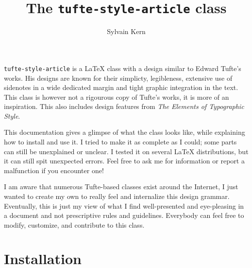 \documentclass[raggedright, 11pt]{tufte-style-article}
\title{The \texttt{tufte-style-article} class}
\author{Sylvain Kern}
\begin{document}
	
\maketitle	

\texttt{tufte-style-article} is a \LaTeX{} class with a design similar to Edward Tufte's works. His designs are known for their simplicty, legibleness, extensive use of sidenotes in a wide dedicated margin and tight graphic integration in the text. This class is however not a rigourous copy of Tufte's works, it is more of an inspiration. This also includes design features from \textit{The Elements of Typographic Style}.

This documentation gives a glimpse of what the class looks like, while explaining how to install and use it. I tried to make it as complete as I could; some parts can still be unexplained or unclear. I tested it on several \LaTeX{} distributions, but it can still spit unexpected errors. Feel free to ask me for information or report a malfunction if you encounter one!

I am aware that numerous Tufte-based classes exist around the Internet, I just wanted to create my own to really feel and internalize this design grammar. Eventually, this is just my view of what I find well-presented and eye-pleasing in a document and not prescriptive rules and guidelines. Everybody can feel free to modify, customize, and contribute to this class.

\tableofcontents

\newpage

\section{Installation}
\end{document}
